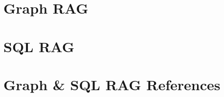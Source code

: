 




\section[GraphRAG]{Graph RAG}




\section[SQLRAG]{SQL RAG}






\section[RAGRefs]{Graph \& SQL RAG References}


